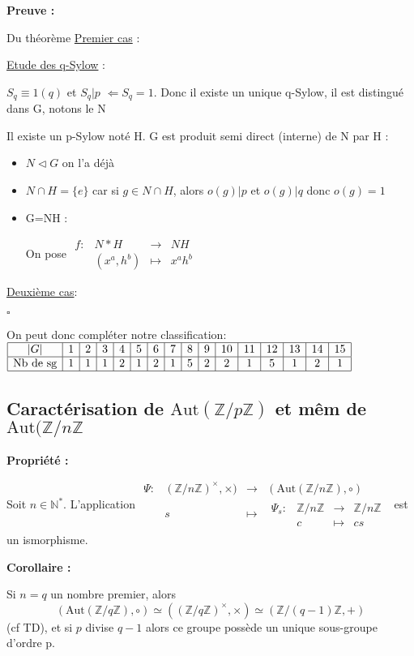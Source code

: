 \documentclass{report}
\renewenvironment{leftbar}{%
  \def\FrameCommand{\vrule width 0.4pt \hspace{10pt}}%
  \MakeFramed {\advance\hsize-\width \FrameRestore}}%
 {\endMakeFramed}%
\newenvironment{preuve}{\vspace*{0.5cm}
    \begin{leftbar}
    \noindent\textbf{Preuve :}\par}{
    \begin{flushright}
    $\square$
    \end{flushright}
    \end{leftbar}
}
\newenvironment{prop}{\begin{tcolorbox}[colframe= white]
    \textbf{Propriété :}
     \par}
    {\end{tcolorbox}}
\newenvironment{corollaire}{\begin{tcolorbox}[colframe= white]
    \textbf{Corollaire :} \par}
    {\end{tcolorbox}}
\newcommand{\fonction}[5]{
    \begin{array}{l|rcl}
    #1: & #2 & \longrightarrow & #3 \\
        & #4 & \longmapsto & #5 
    \end{array}
}
\newcommand{\N}{\mathbb{N}}
\newcommand{\Z}{\mathbb{Z}}
\begin{document}
\begin{preuve} Du théorème
\underline{Premier cas} :\par
\underline{Etude des q-Sylow} :

$S_{q}\equiv 1(q)$ et  $S_{q} | p$ $\Longleftarrow S_{q} = 1$. Donc il existe un unique q-Sylow, il est distingué dans G, notons le N


Il existe un p-Sylow noté H. G est produit semi direct (interne) de N par H :
\begin{itemize}
\item $N\triangleleft G$ on l'a déjà
\item $N\cap H = \{e\}$ car si $g \in N\cap H$, alors $o(g)|p$ et $o(g)|q$ donc $o(g)=1$
\item G=NH :\par 
On pose $\fonction{f}{N* H}{NH}{(x^{a},h^{b})}{x^{a}h^{b}}$
\end{itemize}

\underline{Deuxième cas}:\\

\end{preuve}

On peut donc compléter notre classification:
\\

$\begin{array}{|c|c|c|c|c|c|c|c|c|c|c|c|c|c|c|c|c|}
    \hline
   |G|  & 1 & 2 & 3 & 4 & 5 & 6 & 7 & 8 & 9 & 10 & 11 & 12 & 13 & 14 & 15 \\
   \hline
    \textrm{Nb de sg}  & 1 & 1 & 1 & 2 & 1 & 2 & 1 & 5 & 2 & 2 & 1 & 5 & 1 & 2 & 1 \\
    \hline
\end{array}$

\subsection{Caractérisation de $\mathrm{Aut}(\Z / p\Z)$ et mêm de $\mathrm{Aut}(\Z / n\Z$}

\begin{prop}
    Soit $n\in\N^*$. L'application $\fonction{\Psi}{(\Z / n\Z)^{\times},\times)}{(\mathrm{Aut}(\Z/n\Z),\circ)}{s}{\fonction{\Psi_s}{\Z/n\Z}{\Z/n\Z}{c}{cs}}$ est un ismorphisme.
\end{prop}

\begin{corollaire}
    Si $n = q$ un nombre premier, alors $$(\mathrm{Aut}(\Z/q\Z),\circ) \simeq ((\Z/q\Z)^{\times},\times) \simeq (\Z/(q-1)\Z,+)$$ (cf TD), et si $p$ divise $q-1$ alors ce groupe possède un unique sous-groupe d'ordre p.
\end{corollaire}
\end{document}
